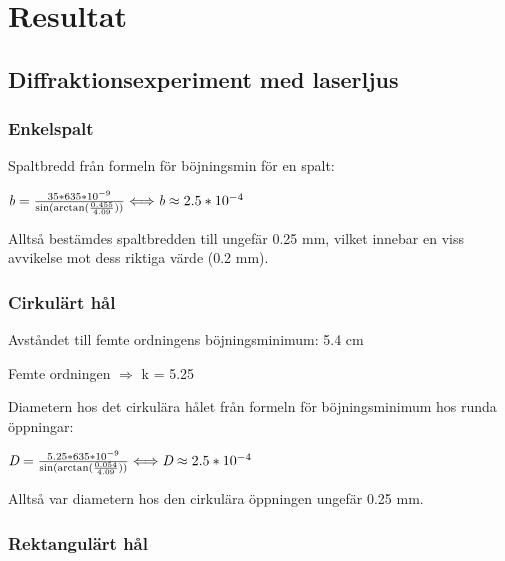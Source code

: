 \documentclass[conference]{IEEEtran}
\begin{document}

\section{Resultat}

\subsection{\textbf{Diffraktionsexperiment med laserljus}}
\subsubsection{Enkelspalt}

Spaltbredd från formeln för böjningsmin för en spalt: 

\begin{math}
\emph{b} = \frac{35 * 635 * 10^{-9}}{\sin(\arctan(\frac{0.455}{4.09}))} \Longleftrightarrow \emph{b} \approx 2.5 * 10^{-4}
\end{math}\vspace{5pt}

Alltså bestämdes spaltbredden till ungefär 0.25 mm, vilket innebar en viss avvikelse mot dess riktiga värde (0.2 mm).

\subsubsection{Cirkulärt hål}
Avståndet till femte ordningens böjningsminimum: 5.4 cm 

Femte ordningen $\Rightarrow$ k = 5.25

Diametern hos det cirkulära hålet från formeln för böjningsminimum hos runda öppningar: 

\begin{math}
\emph{D} = \frac{5.25 * 635 * 10^{-9}}{\sin(\arctan(\frac{0.054}{4.09}))} \Longleftrightarrow \emph{D} \approx 2.5 * 10^{-4}
\end{math}

Alltså var diametern hos den cirkulära öppningen ungefär 0.25 mm. 

\subsubsection{Rektangulärt hål}
\end{document}
